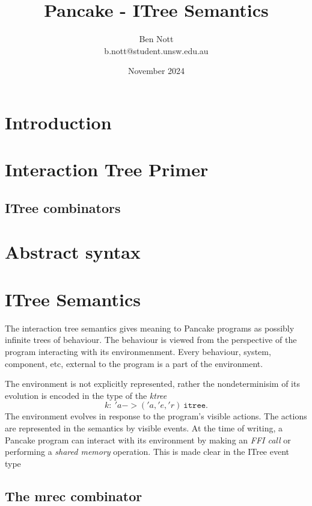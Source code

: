 \documentclass{article}
\title{Pancake - ITree Semantics}
\author{Ben Nott\\\small b.nott@student.unsw.edu.au}
\date{November 2024}
\begin{document}
\maketitle
\tableofcontents

\section{Introduction}
\label{sec:introduction}


\section{Interaction Tree Primer}
\label{sec:inter-tree-prim}

\subsection{ITree combinators}
\label{sec:itree-combinators}

\section{Abstract syntax}
\label{sec:abstract-syntax}

\section{ITree Semantics}
\label{sec:itree-semantics}

The interaction tree semantics gives meaning to Pancake programs as possibly infinite trees of behaviour. The behaviour is viewed from the perspective of the program interacting with its environmenment. Every behaviour, system, component, etc, external to the program is a part of the environment.

The environment is not explicitly represented, rather the nondeterminisim of its evolution is encoded in the type of the \emph{ktree}
\begin{equation*}
  k :\ 'a -> ('a,'e,'r)\ \texttt{itree}.
\end{equation*}
The environment evolves in response to the program's visible actions. The actions are represented in the semantics by visible events. At the time of writing, a Pancake program can interact with its environment by making an \emph{FFI call} or performing a \emph{shared memory} operation. This is made clear in the ITree event type




\subsection{The mrec combinator}
\label{sec:mrec-combinator}
\end{document}
